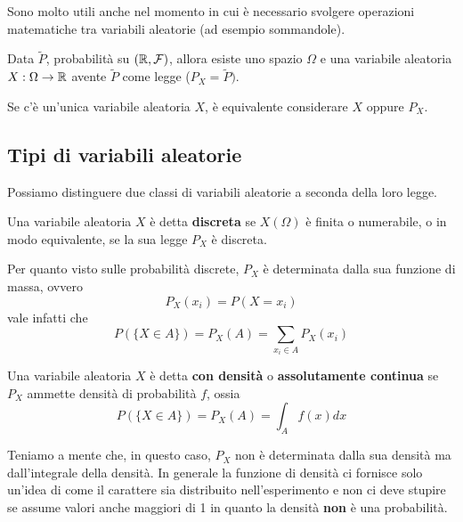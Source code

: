 Sono molto utili anche nel momento in cui è necessario svolgere operazioni matematiche tra
variabili aleatorie (ad esempio sommandole).

\begin{observation}
	Data $\tilde{P}$, probabilità su $(\mathbb{R}, \mathcal{F})$, allora esiste uno spazio $\Omega$ e una variabile
	aleatoria $X : \Omega \to \mathbb{R}$ avente $\tilde{P}$ come legge ($P_X = \tilde{P})$.
\end{observation}

\begin{observation}
	Se c'è un'unica variabile aleatoria $X$, è equivalente considerare $X$ oppure $P_X$.
\end{observation}

\subsection{Tipi di variabili aleatorie}
Possiamo distinguere due classi di variabili aleatorie a seconda della loro legge.

\begin{definition}
	Una variabile aleatoria $X$ è detta \textbf{discreta} se $X(\Omega)$ è finita o numerabile, o
	in modo equivalente, se la sua legge $P_X$ è discreta.
\end{definition}

Per quanto visto sulle probabilità discrete, $P_X$ è determinata dalla sua funzione di massa,
ovvero
\[ P_X (x_i) = P(X = x_i) \]
vale infatti che
\[ P(\{X \in A\}) = P_X (A) = \sum_{x_i \in A} P_X (x_i) \]

\begin{definition}
	Una variabile aleatoria $X$ è detta \textbf{con densità} o \textbf{assolutamente continua} se
	$P_X$ ammette densità di probabilità $f$, ossia
	\[ P(\{X \in A\}) = P_X (A) = \int_A f(x) dx \]
\end{definition}

Teniamo a mente che, in questo caso, $P_X$ non è determinata dalla sua densità ma dall'integrale
della densità. In generale la funzione di densità ci fornisce solo un'idea di come il carattere sia
distribuito nell'esperimento e non ci deve stupire se assume valori anche maggiori di 1 in quanto
la densità \textbf{non} è una probabilità.

